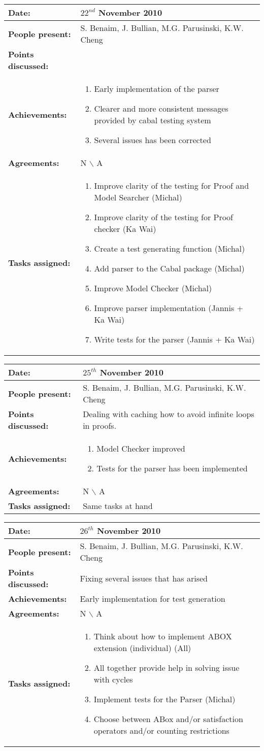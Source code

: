 \documentclass[12pt,a4paper]{article}
\newcommand{\meeting}[6]{%
\begin{center}%
\begin{longtable}{| p{3.5cm} | | p{13cm} |}%
\hline%
\textbf{Date:} & #1 \\%
\hline%
\textbf{People present:} &#2 \\%
\hline%
\textbf{Points discussed:} &#3\\%
\hline%
\textbf{Achievements:} &#4 \\%
\hline%
\textbf{Agreements:} &#5 \\%
\hline%
\textbf{Tasks assigned:} &#6  \\%
\hline%
\end{longtable}%
\end{center}%
\bigbreak
}
\begin{document}
\meeting{$22^{nd}$ November 2010}%
{S. Benaim, J. Bullian, M.G. Parusinski, K.W. Cheng}%
{}%
{\begin{enumerate}
\item Early implementation of the parser
\item Clearer and more consistent messages provided by cabal testing system
\item Several issues has been corrected
\end{enumerate}}%
{N $\backslash$ A}
{\begin{enumerate}
\item Improve clarity of the testing for Proof and Model Searcher (Michal)
\item Improve clarity of the testing for Proof checker (Ka Wai)
\item Create a test generating function (Michal)
\item Add parser to the Cabal package (Michal)
\item Improve Model Checker (Michal)
\item Improve parser implementation (Jannis + Ka Wai)
\item Write tests for the parser (Jannis + Ka Wai)
\end{enumerate}}%

\meeting{$25^{th}$ November 2010}%
{S. Benaim, J. Bullian, M.G. Parusinski, K.W. Cheng}%
{Dealing with caching how to avoid infinite loops in proofs.}%
{\begin{enumerate}
\item Model Checker improved
\item Tests for the parser has been implemented
\end{enumerate}}%
{N $\backslash$ A}
{Same tasks at hand}%

\meeting{$26^{th}$ November 2010}%
{S. Benaim, J. Bullian, M.G. Parusinski, K.W. Cheng}%
{Fixing several issues that has arised
}%
{Early implementation for test generation}%
{N $\backslash$ A}
{\begin{enumerate}
\item Think about how to implement ABOX extension (individual) (All)
\item All together provide help in solving issue with cycles
\item Implement tests for the Parser (Michal)
\item Choose between ABox and/or satisfaction operators and/or counting restrictions
\end{enumerate}}%
\end{document}

